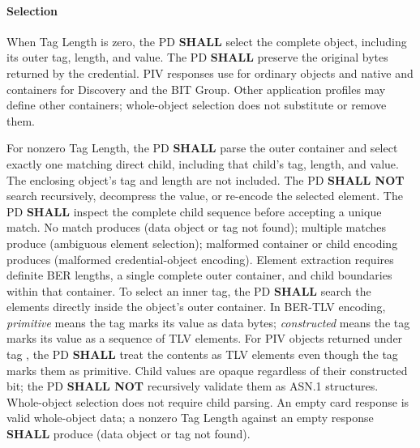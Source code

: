 \paragraph{Selection}
When Tag Length is zero, the PD \textbf{SHALL} select the complete object,
including its outer tag, length, and value. The PD \textbf{SHALL} preserve
the original bytes returned by the credential.
PIV responses use  for ordinary objects and native
 and  containers for Discovery and the BIT Group.
Other application profiles may define other containers; whole-object selection
does not substitute or remove them.

For nonzero Tag Length, the PD \textbf{SHALL} parse the outer container and
select exactly one matching direct child, including that child's tag, length,
and value. The enclosing object's tag and length are not included.
The PD \textbf{SHALL NOT} search recursively, decompress the value, or
re-encode the selected element. The PD \textbf{SHALL} inspect the complete
child sequence before accepting a unique match. No match produces
 (data object or tag not found); multiple matches produce
 (ambiguous element selection); malformed container
or child encoding produces  (malformed credential-object encoding).
Element extraction requires definite
BER lengths, a single complete outer container, and child boundaries within
that container. To select an inner tag, the PD \textbf{SHALL} search the
elements directly inside the object's outer container. In BER-TLV encoding,
\emph{primitive} means the tag marks its value as data bytes;
\emph{constructed} means the tag marks its value as a sequence of TLV elements.
For PIV objects returned under tag , the PD \textbf{SHALL} treat
the contents as TLV elements even though the tag marks them as primitive.
Child values are opaque regardless of their constructed bit; the PD
\textbf{SHALL NOT} recursively validate them as ASN.1 structures.
Whole-object selection does not require child parsing.
An empty card response is valid whole-object data; a nonzero Tag Length
against an empty response \textbf{SHALL} produce 
(data object or tag not found).

